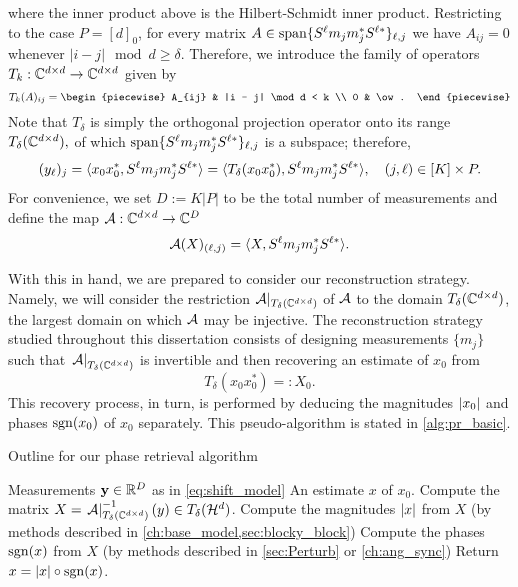 where the inner product above is the Hilbert-Schmidt inner product.  Restricting to the case $P = [d]_0$,  for every matrix $A \in \operatorname{span}\{S^\ell m_j m_j^* S^{\ell *}\}_{\ell, j}$ we have $A_{ij} = 0$ whenever $|i - j| \mod d \ge \delta$.  Therefore, we introduce the family of operators $T_k : \mathbb{C}^{d \times d} \to \mathbb{C}^{d \times d}$ given by \begin{equation} T_k(A)_{ij} = \begin{piecewise} A_{ij} & |i - j| \mod d < k \\ 0 & \ow. \end{piecewise} \label{eq:T_delta} \end{equation}  Note that $T_\delta$ is simply the orthogonal projection operator onto its range $T_\delta(\mathbb{C}^{d \times d}),$ of which $\operatorname{span}\{S^\ell m_j m_j^* S^{\ell *}\}_{\ell, j}$ is a subspace; therefore, \begin{equation} (y_\ell)_j = \langle x_0 x_0^*, S^{\ell} m_j m_j^* S^{\ell *}\rangle = \langle T_{\delta}(x_0 x_0^*), S^{\ell} m_j m_j^* S^{\ell *}\rangle, \quad (j, \ell) \in [K] \times P.  \label{eq:lifted_system} \end{equation}  For convenience, we set $D := K|P|$ to be the total number of measurements and define the map $\mathcal{A} : \mathbb{C}^{d \times d} \to \mathbb{C}^D$ \begin{equation}\mathcal{A}(X)_{(\ell, j)} = \langle X, S^{\ell} m_j m_j^* S^{\ell *}\rangle.\label{eq:linear}\end{equation}  

With this in hand, we are prepared to consider our reconstruction strategy.  Namely, we will consider the restriction $\mathcal{A}|_{T_{\delta}(\mathbb{C}^{d \times d})}$ of $\mathcal{A}$ to the domain $T_{\delta}(\mathbb{C}^{d \times d})$, the largest domain on which $\mathcal{A}$ may be injective.  The reconstruction strategy studied throughout this dissertation consists of designing measurements $\{m_j\}$ such that $\left.\mathcal{A}\right|_{T_{\delta}(\mathbb{C}^{d \times d})}$ is invertible and then recovering an estimate of $x_0$ from \begin{equation}T_\delta(x_0 x_0^*) =: X_0. \label{equdef:X0} \end{equation}  This recovery process, in turn, is performed by deducing the magnitudes $\lvert x_0\rvert$ and phases $\operatorname{sgn}(x_0)$ of $x_0$ separately.  This pseudo-algorithm is stated in \cref{alg:pr_basic}.

\begin{algorithm}
\renewcommand{\algorithmicrequire}{\textbf{Input:}}
\renewcommand{\algorithmicensure}{\textbf{Output:}}
\caption{Outline for our phase retrieval algorithm}
\label{alg:pr_basic}
\begin{algorithmic}[1]
    \REQUIRE Measurements $\mathbf y\in \mathbb{R}^D$ as in \eqref{eq:shift_model}
    \ENSURE An estimate $x$ of $x_0$.
    \STATE Compute the matrix $X = \left.\mathcal{A}\right|_{T_\delta(\mathbb{C}^{d \times d})}^{-1}(y) \in T_{\delta}(\mathcal{H}^d)$.
    \STATE Compute the magnitudes $\lvert x\rvert$ from $X$ (by methods described in \cref{ch:base_model,sec:blocky_block}) \label{line:mag_rec}
    \STATE Compute the phases $\operatorname{sgn}(x)$ from $X$ (by methods described in \cref{sec:Perturb} or \cref{ch:ang_sync})\label{line:ang_sync}
    \STATE Return $x = \lvert x\rvert \circ \operatorname{sgn}(x)$.
    \end{algorithmic}
\end{algorithm}

